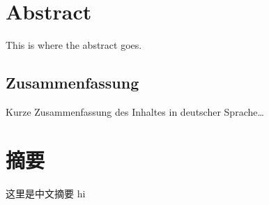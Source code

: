 \begingroup
\let\clearpage\relax
\let\cleardoublepage\relax
\let\cleardoublepage\relax

\chapter*{Abstract}
This is where the abstract goes. 

\vfill

\begin{otherlanguage}{ngerman}
\chapter*{Zusammenfassung}
Kurze Zusammenfassung des Inhaltes in deutscher Sprache\dots
\end{otherlanguage}

\vfill


\chapter*{摘要}
这里是中文摘要   hi


\vfill

\endgroup
